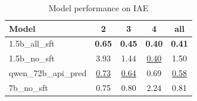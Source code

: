 \begin{table}[ht]
\centering
\begin{tabular}{lcccc}
\toprule
Model & 2 & 3 & 4 & all \\
\midrule
1.5b\_all\_sft & \textbf{0.65} & \textbf{0.45} & \textbf{0.40} & \textbf{0.41} \\
1.5b\_no\_sft & 3.93 & 1.44 & \underline{0.40} & 1.50 \\
qwen\_72b\_api\_pred & \underline{0.73} & \underline{0.64} & 0.69 & \underline{0.58} \\
7b\_no\_sft & 0.75 & 0.80 & 2.24 & 0.81 \\
\bottomrule
\end{tabular}
\caption{Model performance on IAE}
\label{tab:iae}
\end{table}

